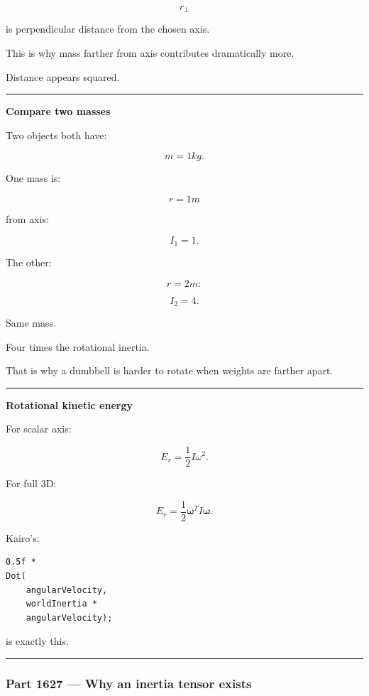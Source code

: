 \[
r_\perp
\]

is perpendicular distance from the chosen axis.

This is why mass farther from axis contributes dramatically more.

Distance appears squared.

\begin{center}\rule{0.5\linewidth}{0.5pt}\end{center}

\textbf{Compare two masses}

Two objects both have:

\[
m=1kg.
\]

One mass is:

\[
r=1m
\]

from axis:

\[
I_1=1.
\]

The other:

\[
r=2m:
\]

\[
I_2=4.
\]

Same mass.

Four times the rotational inertia.

That is why a dumbbell is harder to rotate when weights are farther apart.

\begin{center}\rule{0.5\linewidth}{0.5pt}\end{center}

\textbf{Rotational kinetic energy}

For scalar axis:

\[
E_r
=
\frac12I\omega^2.
\]

For full 3D:

\[
\boxed{
E_r
=
\frac12
\boldsymbol{\omega}^T
I
\boldsymbol{\omega}.
}
\]

Kairo's:

\begin{verbatim}
0.5f *
Dot(
    angularVelocity,
    worldInertia *
    angularVelocity);
\end{verbatim}

is exactly this.

\begin{center}\rule{0.5\linewidth}{0.5pt}\end{center}

\subsubsection{Part 1627 --- Why an inertia tensor exists}\label{part-1627-why-an-inertia-tensor-exists}

